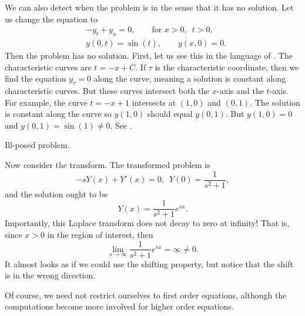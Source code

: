 We can also detect when the problem is
\emph{}
in the sense that it has no solution.
Let us change the equation to
\begin{align*}
& -y_t + y_x = 0, \qquad \text{for } x > 0, \enspace t > 0,
\\
& y(0,t) = \sin(t), \qquad y(x,0) = 0 .
\end{align*}
Then the problem
has no solution.  First, let us see this in the language of
.
The characteristic curves are $t=-x+C$.  If $\tau$ is
the characteristic coordinate, then we find the equation $y_\tau = 0$
along the curve,
meaning a solution is constant along characteristic curves.
But these curves intersect both the $x$-axis and the $t$-axis.
For example,
the curve $t=-x+1$ intersects at $(1,0)$ and $(0,1)$.  The solution is
constant along the curve so $y(1,0)$ should equal $y(0,1)$.  But
$y(1,0) = 0$ and $y(0,1) = \sin(1) \not= 0$.
See .

\begin{myfig}
\capstart
{}
\caption{Ill-posed problem.\label{lt:half-infinite-ill-posed}}
\end{myfig}

Now consider the transform.  The transformed problem is
\begin{equation*}
-sY(x) + Y'(x) = 0, \enspace Y(0) = \frac{1}{s^2+1} ,
\end{equation*}
and the solution ought to be
\begin{equation*}
Y(x) = \frac{1}{s^2+1} e^{sx} .
\end{equation*}
Importantly, this Laplace transform does not decay to zero at infinity!  That is,
since $x > 0$ in the region of interest, then
\begin{equation*}
\lim_{s \to \infty}
\frac{1}{s^2+1} e^{sx}
= \infty \not= 0 .
\end{equation*}
It almost
looks as if we could use the shifting property, but notice that the shift
is in the wrong direction.

\medskip

Of course, we need not restrict ourselves to first order equations, although
the computations become more involved for higher order equations.

